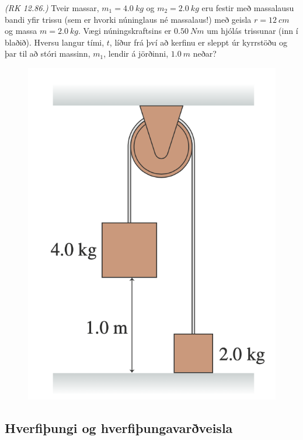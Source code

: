 \begin{enumerate}[label = \textbf{Dæmi \thechapter.\arabic*.}]
\begin{minipage}{\linewidth}
\vspace{0.5cm}

\item \textit{(RK 12.86.)} Tveir massar, $m_1 = \SI{4.0}{kg}$ og $m_2 = \SI{2.0}{kg}$ eru festir með massalausu bandi yfir trissu (sem er hvorki núninglaus né massalaus!) með geisla $r = \SI{12}{cm}$ og massa $m = \SI{2.0}{kg}$. Vægi núningskraftsins er $\SI{0.50}{Nm}$ um hjólás trissunar (inn í blaðið). Hversu langur tími, $t$, líður frá því að kerfinu er sleppt úr kyrrstöðu og þar til að stóri massinn, $m_1$, lendir á jörðinni, $\SI{1.0}{m}$ neðar?
\end{minipage}

\begin{figure}[H]
    \centering
    \includegraphics[scale = 0.45]{images/atwoopalaca.png}
\end{figure}


\subsection*{Hverfiþungi og hverfiþungavarðveisla}


\end{enumerate}
